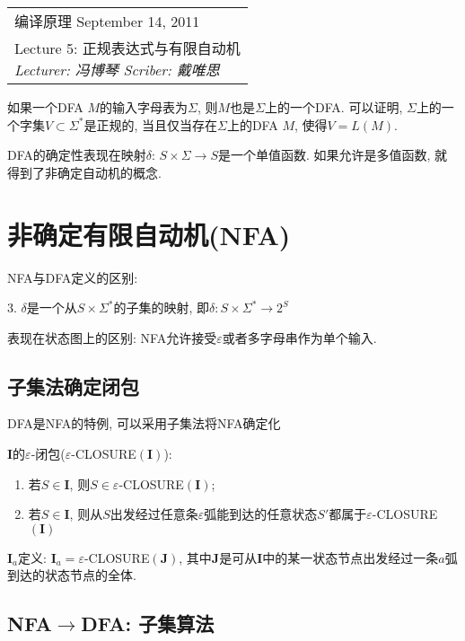 \def\lecture{5}
\clearpage \noindent\begin{tabularx}{\linewidth}{|X|}
\hline \vskip -2mm
{\sf 编译原理} \hfill September 14, 2011 \\
{\centering \sf \large Lecture \lecture:
正规表达式与有限自动机 \\ }
\textsl{Lecturer: 冯博琴 \hfill Scriber: 戴唯思}\\ \hline
\end{tabularx}
\setcounter{section}{0}
\renewcommand{\thepage}{\lecture -\arabic{page}}

如果一个DFA $M$的输入字母表为$\Sigma$, 则$M$也是$\Sigma$上的一个DFA. 可以证明, $\Sigma$上的一个字集$V\subset\Sigma^*$是正规的, 当且仅当存在$\Sigma$上的DFA $M$, 使得$V=L(M)$.

DFA的确定性表现在映射$\delta$: $S\times\Sigma\to S$是一个单值函数. 如果允许是多值函数, 就得到了非确定自动机的概念.

\section{非确定有限自动机(NFA)}

    NFA与DFA定义的区别:

    3. $\delta$是一个从$S\times\Sigma^*$的子集的映射, 即$\delta: S\times\Sigma^*\to2^S$

    表现在状态图上的区别: NFA允许接受$\varepsilon$或者多字母串作为单个输入. 

    \subsection{子集法确定闭包}

        DFA是NFA的特例, 可以采用子集法将NFA确定化

        $\mathbf{I}$的$\varepsilon$-闭包($\varepsilon$-CLOSURE$(\mathbf{I})$):
        \begin{enumerate}
            \item 若$S\in \mathbf{I}$, 则$S\in \varepsilon$-CLOSURE$(\mathbf{I})$;
            \item 若$S\in \mathbf{I}$, 则从$S$出发经过任意条$\varepsilon$弧能到达的任意状态$S'$都属于$\varepsilon$-CLOSURE$(\mathbf{I})$
        \end{enumerate}

        $\mathbf{I}_a$定义: $\mathbf{I}_a=\varepsilon$-CLOSURE$(\mathbf{J})$, 其中$\mathbf{J}$是可从$\mathbf{I}$中的某一状态节点出发经过一条$a$弧到达的状态节点的全体.

    \subsection{NFA$\to$DFA: 子集算法}

